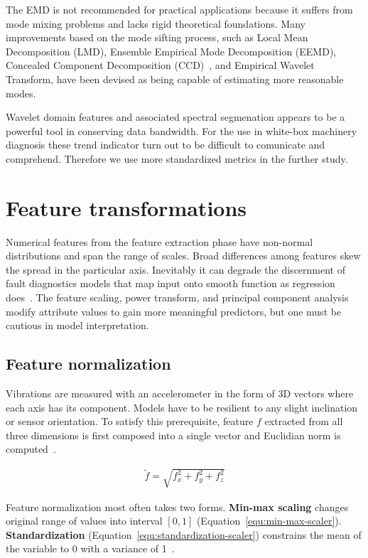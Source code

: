 The EMD is not recommended for practical applications because it suffers from mode mixing problems and lacks rigid theoretical foundations. Many improvements based on the mode sifting process, such as Local Mean Decomposition (LMD), Ensemble Empirical Mode Decomposition (EEMD), Concealed Component Decomposition (CCD)~\cite{tiwari_novel_2021}, and Empirical Wavelet Transform, have been devised as being capable of estimating more reasonable modes.

Wavelet domain features and associated spectral segmenation appears to be a powerful tool in conserving data bandwidth. For the use in white-box machinery diagnosis these trend indicator turn out to be difficult to comunicate and comprehend. Therefore we use more standardized metrics in the further study.

\section{Feature transformations}
Numerical features from the feature extraction phase have non-normal distributions and span the range of scales. Broad differences among features skew the spread in the particular axis. Inevitably it can degrade the discernment of fault diagnostics models that map input onto smooth function as regression does~\cite{zheng_feature_2018}. The feature scaling, power transform, and principal component analysis modify attribute values to gain more meaningful predictors, but one must be cautious in model interpretation.

\subsection{Feature normalization}
Vibrations are measured with an accelerometer in the form of 3D vectors where each axis has its component. Models have to be resilient to any slight inclination or sensor orientation. To satisfy this prerequisite, feature $f$ extracted from all three dimensions is first composed into a single vector and Euclidian norm is computed~\cite{kamminga_robust_2018}.

\begin{ceqn}\begin{align}
\widetilde{f} = \sqrt{f_x^2 + f_y^2 + f_z^2}
\end{align}\end{ceqn}

Feature normalization most often takes two forms. \textbf{Min-max scaling} changes original range of values into interval $[0, 1]$ (Equation~\ref{equ:min-max-scaler}). \textbf{Standardization} (Equation~\ref{equ:standardization-scaler}) constrains the mean of the variable to 0 with a variance of 1~\cite{zheng_feature_2018}.

